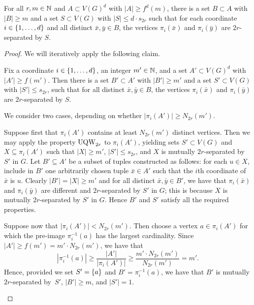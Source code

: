 \begin{lemma}\label{lem:step1} For all $r,m\in \mathbb{N}$ and $A\subset V(G)^d$ with $|A|\ge f^d(m)$,
	there is a set $B\subset A$ with $|B|\ge m$ and a set $S\subset V(G)$ with $|S|\le d\cdot s_{2r}$ 
	such that for each coordinate $i\in\{1,\ldots,d\}$ and all distinct $\bar x,\bar y\in B$,
        the vertices $\pi_i(\bar x)$ and $\pi_i(\bar y)$ are $2r$-separated by $S$. 
\end{lemma}
\begin{proof}
We will iteratively apply the following claim.


\begin{claim}\label{claim:ith-coord}
Fix a coordinate $i\in\{1,\ldots,d\}$, an integer $m'\in\mathbb{N}$, and a  set $A'\subset V(G)^d$ with  $|A'|\ge f(m')$.
Then there is a set $B'\subset A'$ with $|B'|\ge m'$
and a set $S'\subset V(G)$ with $|S'|\le  s_{2r}$, such that for all distinct $\bar x,\bar y\in B$,
the vertices $\pi_i(\bar x)$ and $\pi_i(\bar y)$ are $2r$-separated by $S$.
\end{claim}
\begin{clproof}
We consider two cases, depending on whether $|\pi_i(A')|\geq N_{2r}(m')$.

Suppose first that $\pi_i(A')$ contains at least $N_{2r}(m')$ distinct vertices.
Then we may apply the property $\mathrm{UQW}_{2r}$ to $\pi_i(A')$, yielding sets $S'\subset V(G)$ and $X\subseteq \pi_i(A')$
such that $|X|\ge m'$, $|S'|\le s_{2r}$, and $X$ is mutually $2r$-separated by $S'$ in $G$. 
Let $B'\subseteq A'$ be a subset of tuples constructed as follows: for each $u\in X$, include in $B'$ one arbitrarily chosen tuple $\bar x\in A'$ such that the $i$th coordinate of $\bar x$ is $u$.
Clearly $|B'|=|X|\ge m'$ and for all distinct $\bar x,\bar y\in B'$, we have that $\pi_i(\bar x)$ and $\pi_i(\bar y)$ are different and $2r$-separated by $S'$ in $G$; this is because $X$ is mutually $2r$-separated by $S'$
in $G$. Hence $B'$ and $S'$ satisfy all the required properties.

Suppose now that $|\pi_i(A')|<N_{2r}(m')$. 
Then choose a vertex $a\in \pi_i(A')$ for which the pre-image $\pi_i^{-1}(a)$ has the largest cardinality.
Since $|A'|\geq f(m')=m'\cdot N_{2r}(m')$, we have that 
$$|\pi_i^{-1}(a)|\geq \frac{|A'|}{|\pi_i(A')|}\geq \frac{m'\cdot N_{2r}(m')}{N_{2r}(m')}=m'.$$
Hence, provided we set $S'=\{a\}$ and $B'=\pi_i^{-1}(a)$, we have that $B'$ is mutually $2r$-separated by~$S'$, $|B'|\geq m$, and $|S'|=1$.
\end{clproof}


\end{proof}
